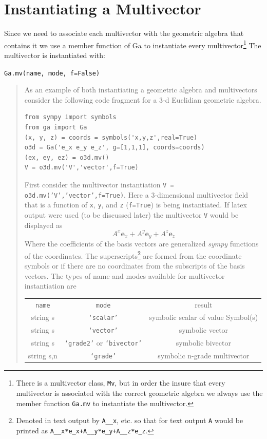 \documentclass[12pt]{report}
\newcommand{\bm}[1]{\boldsymbol{#1}}
\newcommand{\be}{\begin{equation}}
\newcommand{\ee}{\end{equation}}
\newcommand{\eb}{\bm{e}}
\newcommand{\T}[1]{\texttt{#1}}
\begin{document}
\section{Instantiating a Multivector}

Since we need to associate each multivector with the geometric algebra that contains it
we use a member function of Ga to instantiate every multivector\footnote{There is a
multivector class, \T{Mv}, but in order the insure that every multivector is associated
with the correct geometric algebra we always use the member function \T{Ga.mv} to instantiate
the multivector.}  The multivector is instantiated with:

\T{Ga.mv(name, mode, f=False)}
\begin{quote}
As an example of both instantiating a geometric algebra and multivectors consider the 
following code fragment for a 3-d Euclidian geometric algebra.
\begin{lstlisting}
from sympy import symbols
from ga import Ga
(x, y, z) = coords = symbols('x,y,z',real=True)
o3d = Ga('e_x e_y e_z', g=[1,1,1], coords=coords)
(ex, ey, ez) = o3d.mv()
V = o3d.mv('V','vector',f=True)
\end{lstlisting}	
First consider the multivector instantiation \T{V = o3d.mv('V','vector',f=True)}.  Here
a 3-dimensional multivector field that is a function of \T{x}, \T{y}, and \T{z} (\T{f=True}) is 
being instantiated.  If latex output were used (to be discussed later) the multivector
\T{V} would be displayed as
\be
	A^{x}\eb_{x} + A^{y}\eb_{y} + A^{z}\eb_{z} 
\ee
Where the coefficients of the basis vectors are generalized \emph{sympy} functions of the
coordinates.  The superscripts\footnote{Denoted in text output by \T{A\_\_x}, etc. so
that for text output \T{A} would be printed as \T{A\_\_x*e\_x+A\_\_y*e\_y+A\_\_z*e\_z}.} are formed
from the coordinate symbols or if there are no coordinates from the subscripts of 
the basis vectors.  The types of name and modes available for multivector instantiation are
\begin{center}
   \begin{longtable}{ccc}
    \T{name} &  \T{mode}  &  result \\
         string s &  \T{`scalar'} & symbolic scalar of value Symbol(s) \\
         string s  &\T{`vector'} &  symbolic vector \\
         string s & \T{`grade2'} or \T{`bivector'} & symbolic bivector \\ 
         string s,n &  \T{`grade'} & symbolic n-grade multivector \\

\end{longtable}
\end{center}
\end{quote}
\end{document}
